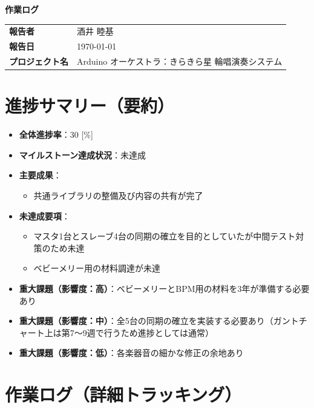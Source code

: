 \documentclass[a4paper,12pt]{ltjsarticle}
\begin{document}
\begin{center}
  {\LARGE\bfseries 作業ログ}
\end{center}

\vspace{4mm}

\begin{tabular}{ll}
  \textbf{報告者} & 酒井 睦基 \\
  \textbf{報告日} & \today \\
  \textbf{プロジェクト名} & Arduino オーケストラ：きらきら星 輪唱演奏システム \\
\end{tabular}

\vspace{6mm}

\section{進捗サマリー（要約）}

\begin{itemize}
  \item \textbf{全体進捗率}：30 [\%]
  \item \textbf{マイルストーン達成状況}：未達成
  \item \textbf{主要成果}：
    \begin{itemize}
      \item 共通ライブラリの整備及び内容の共有が完了
    \end{itemize}
  \item \textbf{未達成要項}：
    \begin{itemize}
      \item マスタ1台とスレーブ4台の同期の確立を目的としていたが中間テスト対策のため未達
      \item ベビーメリー用の材料調達が未達
    \end{itemize}
  \item \textbf{重大課題（影響度：高）}：ベビーメリーとBPM用の材料を3年が準備する必要あり
  \item \textbf{重大課題（影響度：中）}：全5台の同期の確立を実装する必要あり（ガントチャート上は第7〜9週で行うため進捗としては通常）
  \item \textbf{重大課題（影響度：低）}：各楽器音の細かな修正の余地あり
\end{itemize}

\section{作業ログ（詳細トラッキング）}
\end{document}

